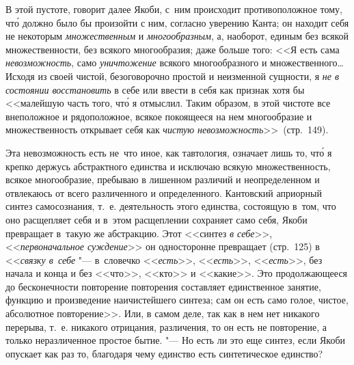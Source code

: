 В этой пустоте, говорит далее Якоби, с~ним происходит противоположное тому,
чт\'{о} должно было бы произойти с ним, согласно уверению Канта; он находит
себя не некоторым {\em множественным} и {\em многообразным}, а, наоборот,
единым без всякой множественности, без всякого многообразия; даже больше того:
<<Я есть сама {\em невозможность}, само {\em уничтожение} всякого
многообразного и множественного\ldots Исходя из своей чистой, безоговорочно
простой и неизменной сущности, я {\em не в состоянии восстановить} в себе или
ввести в себя как признак хотя бы <<малейшую часть того, чт\'{о} я отмыслил.
Таким образом, в этой чистоте все внеположное и рядоположное, всякое покоящееся
на нем многообразие и множественность открывает себя как
{\em чистую невозможность}>>~(стр.~149).

Эта невозможность есть не~что иное, как тавтология, означает лишь то, чт\'{о} я
крепко держусь абстрактного единства и исключаю всякую множественность, всякое
многообразие, пребываю в лишенном различий и неопределенном и отвлекаюсь от
всего различенного и определенного. Кантовский априорный синтез самосознания,
т.~е. деятельность этого единства, состоящую в~том, что оно расщепляет себя и
в~этом расщеплении сохраняет само себя, Якоби превращает в~такую же абстракцию.
Этот <<синтез {\em в себе}>>, <<{\em первоначальное суждение}>> он односторонне
превращает (стр.~125) в <<{\em связку в~себе} "--- в~словечко <<{\em есть}>>,
<<{\em есть}>>, <<{\em есть}>>, без начала и конца и без <<что>>, <<кто>> и
<<какие>>. Это продолжающееся до бесконечности повторение повторения составляет
единственное занятие, функцию и произведение наичистейшего синтеза; сам он есть
само голое, чистое, абсолютное повторение>>. Или, в самом деле, так как в нем
нет никакого перерыва, т.~е. никакого отрицания, различения, то он есть не
повторение, а только неразличенное простое бытие. "--- Но есть ли это еще
синтез, если Якоби опускает как раз то, благодаря чему единство есть
синтетическое единство?

